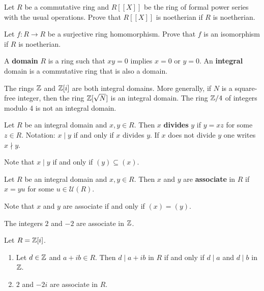 \begin{exercise}
    Let $R$ be a commutative ring and $R[\![X]\!]$ be the ring of formal power series with the usual operations.  
	Prove that $R[\![X]\!]$ is noetherian if $R$ is noetherian. 	
\end{exercise}

\begin{exercise}
	Let $f\colon R\to R$ be a surjective ring homomorphism. Prove that $f$ is an isomorphism
	if $R$ is noetherian. 	
\end{exercise}


\begin{definition}
    A \textbf{domain} $R$ is a ring such that $xy=0$ implies $x=0$ or $y=0$. 
    An \textbf{integral} domain is a commutative ring that is also a domain. 
\end{definition}

The rings $\mathbb{Z}$ and $\mathbb{Z}[i]$ are both integral domains. 
More generally, if $N$ is a square-free integer, 
then the ring $\mathbb{Z}[\sqrt{N}]$ is an integral domain.  
The ring $\mathbb{Z}/4$ of 
integers modulo 4 is not an integral domain. 

\begin{definition}
	Let $R$ be an integral domain and $x,y\in R$. Then $x$ \textbf{divides} $y$ 
	if $y=xz$ for some $z\in R$. 
	Notation: $x\mid y$ if and only if $x$ divides $y$. If $x$ does not
	divide $y$ one writes $x\nmid y$.  
\end{definition}

Note that $x\mid y$ if and only if $(y)\subseteq (x)$.
	
\begin{definition}
	Let $R$ be an integral domain and $x,y\in R$. Then $x$ and $y$ are
	\textbf{associate} in $R$ if $x=yu$ for some $u\in\mathcal{U}(R)$. 
\end{definition}

Note that $x$ and $y$ are associate if and only if $(x)=(y)$.  

\begin{example}
	The integers $2$ and $-2$ are associate in $\mathbb{Z}$.	
\end{example}

\begin{example}
	Let $R=\mathbb{Z}[i]$. 
	\begin{enumerate}
		\item Let $d\in\mathbb{Z}$ and $a+ib\in R$. Then $d\mid a+ib$ in $R$ if and only if 
			$d\mid a$ and $d\mid b$ in $\mathbb{Z}$. 
		\item $2$ and $-2i$ are associate in $R$.
	\end{enumerate} 	
\end{example}

